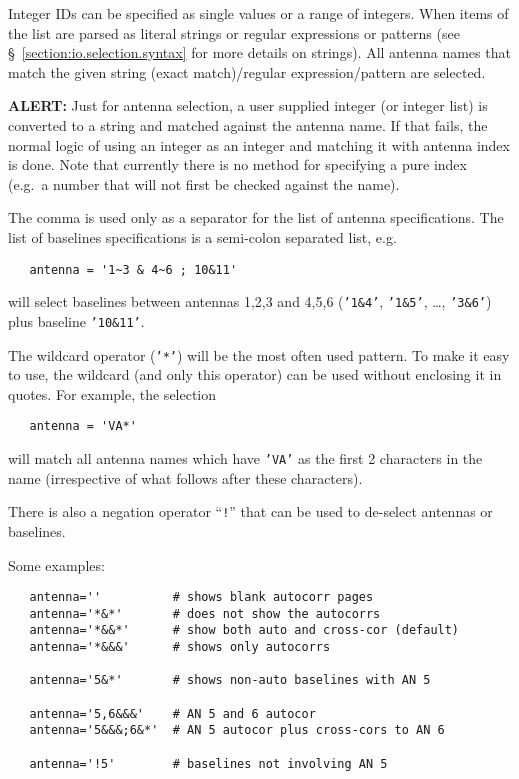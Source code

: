 Integer IDs can be specified as single values or a range of integers.
When items of the list are parsed as literal strings or regular
expressions or patterns (see \S~\ref{section:io.selection.syntax} 
for more details on strings).  All antenna names that match the given 
string (exact match)/regular expression/pattern are selected.

{\bf ALERT:} Just for antenna selection, a user supplied integer (or
integer list) is converted to a string and matched against the antenna
name. If that fails, the normal logic of using an integer as an
integer and matching it with antenna index is done.  Note that
currently there is no method for specifying a pure index (e.g.\ a
number that will not first be checked against the name).

The comma is used only as a separator for the list of antenna
specifications.  The list of baselines specifications is a
semi-colon separated list, e.g.
\small
\begin{verbatim}
   antenna = '1~3 & 4~6 ; 10&11'
\end{verbatim}
\normalsize
will select baselines between antennas 1,2,3 and 4,5,6
({\tt '1\&4'}, {\tt '1\&5'}, \ldots, {\tt '3\&6'}) plus
baseline {\tt '10\&11'}.

The wildcard operator ({\tt '*'}) will be the most often used
pattern. To make it easy to use, the wildcard (and only this
operator) can be used without enclosing it in quotes.  
For example, the selection
\small
\begin{verbatim}
   antenna = 'VA*'
\end{verbatim}
\normalsize
will match all antenna names which have {\tt 'VA'} as the first 2
characters in the name (irrespective of what follows after these
characters).

There is also a negation operator ``{\tt !}'' that can be used to
de-select antennas or baselines.

Some examples:
\small
\begin{verbatim}
   antenna=''          # shows blank autocorr pages
   antenna='*&*'       # does not show the autocorrs
   antenna='*&&*'      # show both auto and cross-cor (default)
   antenna='*&&&'      # shows only autocorrs

   antenna='5&*'       # shows non-auto baselines with AN 5

   antenna='5,6&&&'    # AN 5 and 6 autocor
   antenna='5&&&;6&*'  # AN 5 autocor plus cross-cors to AN 6

   antenna='!5'        # baselines not involving AN 5
\end{verbatim}
\normalsize

